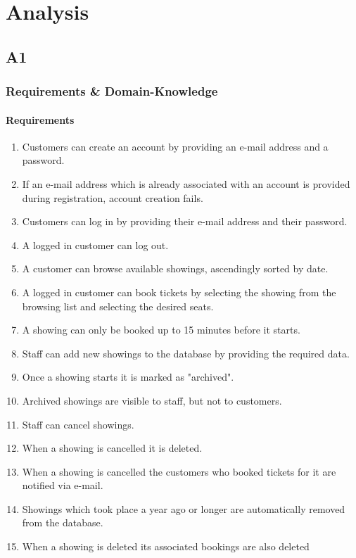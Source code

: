 \documentclass[a4paper,10pt,titlepage,bibtotoc,bibtotocnumbered]{scrreprt}
\begin{document}
\tableofcontents
\listoffigures

\chapter{Analysis}
\section{A1}

\subsection{Requirements \& Domain-Knowledge}

\subsubsection{Requirements}
\begin{enumerate}[R1]
	\item Customers can create an account by providing an e-mail address and a password.
	\item If an e-mail address which is already associated with an account is provided during registration, account creation fails.
    \item Customers can log in by providing their e-mail address and their password.
    \item A logged in customer can log out.
    \item A customer can browse available showings, ascendingly sorted by date.
    \item A logged in customer can book tickets by selecting the showing from the browsing list and selecting the desired seats.
    \item A showing can only be booked up to 15 minutes before it starts.
    \item Staff can add new showings to the database by providing the required data.
    \item Once a showing starts it is marked as "archived".
    \item Archived showings are visible to staff, but not to customers.
    \item Staff can cancel showings.
    \item When a showing is cancelled it is deleted.
    \item When a showing is cancelled the customers who booked tickets for it are notified via e-mail.
    \item Showings which took place a year ago or longer are automatically removed from the database.
    \item When a showing is deleted its associated bookings are also deleted
    
\end{enumerate}
\end{document}
